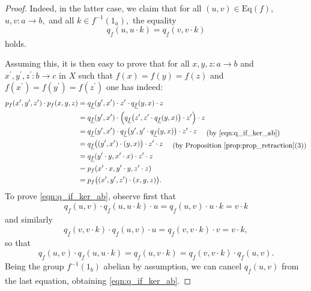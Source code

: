 \documentclass[11pt]{amsart}
\theoremstyle{plain}
\theoremstyle{definition}
\theoremstyle{remark}
\newcommand{\un}{\underline}
\begin{document}
\begin{proof}
Indeed, in the latter case, we claim that for all $(u,v)\in\mathrm{Eq}(f),$ $u,v\colon a\rightarrow b,$ and all $k\in f^{-1}(1_a),$ the equality
\begin{equation}
\label{eqn:q_if_ker_ab}
q_{\un{f}}(u,u\cdot k)=q_{\un{f}}(v,v\cdot k)
\end{equation}
holds.

Assuming this, it is then easy to prove that for all $x,y,z\colon a\rightarrow b$ and $x^\prime,y^\prime,z^\prime\colon b\rightarrow c$ in $X$ such that $f(x)=f(y)=f(z)$ and $f(x^\prime)=f(y^\prime)=f(z^\prime)$ one has indeed:
\begin{equation*}
\begin{split}
p_f(x^\prime,y^\prime,z^\prime)\cdot p_f(x,y,z)&=q_{\un{f}}(y^\prime,x^\prime)\cdot z^\prime\cdot q_{\un{f}}(y,x)\cdot z \\
&=q_{\un{f}}(y^\prime,x^\prime)\cdot\Big(q_{\un{f}}\big(z^\prime,z^\prime\cdot q_{\un{f}}(y,x)\big)\cdot z^\prime\Big)\cdot z\\
&=q_{\un{f}}(y^\prime,x^\prime)\cdot q_{\un{f}}\big(y^\prime,y^\prime\cdot q_{\un{f}}(y,x)\big)\cdot z^\prime\cdot z \ \ \ \ \txt{(by \eqref{eqn:q_if_ker_ab})}\\
&=q_{\un{f}}\big((y^\prime,x^\prime)\cdot (y,x)\big)\cdot z^\prime\cdot z \ \ \ \ \txt{(by Proposition \ref{prop:prop_retraction}(3))}\\
&=q_{\un{f}}(y^\prime\cdot y,x^\prime\cdot x)\cdot z^\prime\cdot z\\
&=p_f(x^\prime\cdot x,y^\prime\cdot y,z^\prime\cdot z)\\
&=p_f\big((x^\prime,y^\prime,z^\prime)\cdot(x,y,z)\big).
\end{split}
\end{equation*}
To prove \eqref{eqn:q_if_ker_ab}, observe first that
\begin{equation*}
q_{\un{f}}(u,v)\cdot q_{\un{f}}(u,u\cdot k)\cdot u=q_{\un{f}}(u,v)\cdot u\cdot k=v\cdot k
\end{equation*}
and similarly
\begin{equation*}
q_{\un{f}}(v,v\cdot k)\cdot q_{\un{f}}(u,v)\cdot u=q_{\un{f}}(v,v\cdot k)\cdot v=v\cdot k,
\end{equation*}
so that
\[
q_{\un{f}}(u,v)\cdot q_{\un{f}}(u,u\cdot k)=q_{\un{f}}(u,v\cdot k)=q_{\un{f}}(v,v\cdot k)\cdot q_{\un{f}}(u,v).
\]
Being the group $f^{-1}(1_b)$ abelian by assumption, we can cancel $q_{\un{f}}(u,v)$ from the last equation, obtaining \eqref{eqn:q_if_ker_ab}.

\end{proof}
\end{document}
